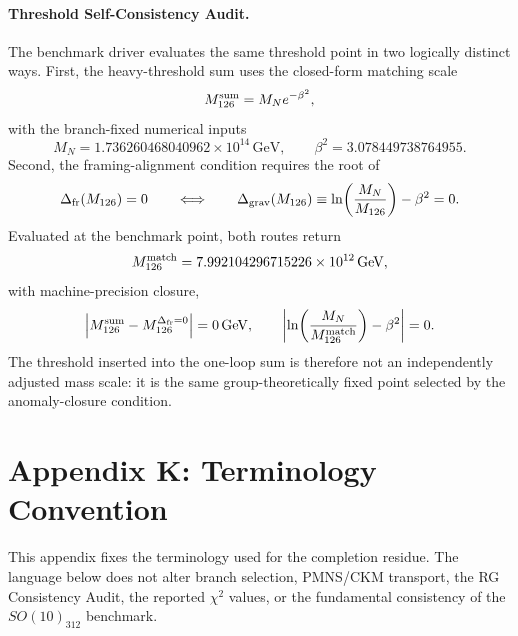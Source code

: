 \documentclass[11pt]{article}
\makeatletter
\newcommand{\manualappendixlabel}[2]{%
  \begingroup
  \def\@currentlabel{#1}%
  \label{#2}%
  \endgroup
}
\makeatother
\begin{document}
\paragraph{Threshold Self-Consistency Audit.}
The benchmark driver evaluates the same threshold point in two logically distinct ways. First, the heavy-threshold sum uses the closed-form matching scale
\begin{equation}
 M_{126}^{\rm sum}=M_Ne^{-\beta^2},
\end{equation}
with the branch-fixed numerical inputs
\begin{equation}
 M_N=1.736260468040962\times10^{14}\,\mathrm{GeV},
 \qquad
 \beta^2=3.078449738764955.
\end{equation}
Second, the framing-alignment condition requires the root of
\begin{equation}
 \Delta_{\rm fr}(M_{126})=0
 \qquad\Longleftrightarrow\qquad
 \Delta_{\rm grav}(M_{126})\equiv\ln\!\left(\frac{M_N}{M_{126}}\right)-\beta^2=0.
\end{equation}
Evaluated at the benchmark point, both routes return
\begin{equation}
 M_{126}^{\rm match}=7.992104296715226\times10^{12}\,\mathrm{GeV},
\end{equation}
with machine-precision closure,
\begin{equation}
 \left|M_{126}^{\rm sum}-M_{126}^{\Delta_{\rm fr}=0}\right|=0\,\mathrm{GeV},
 \qquad
 \left|\ln\!\left(\frac{M_N}{M_{126}^{\rm match}}\right)-\beta^2\right|=0.
\end{equation}
The threshold inserted into the one-loop sum is therefore not an independently adjusted mass scale: it is the same group-theoretically fixed point selected by the anomaly-closure condition.


\section*{Appendix K: Terminology Convention}\manualappendixlabel{K}{app:interpretive-mappings}

This appendix fixes the terminology used for the completion residue. The
language below does not alter branch selection, PMNS/CKM transport, the RG
Consistency Audit, the reported $\chi^2$ values, or the fundamental
consistency of the $SO(10)_{312}$ benchmark.
\end{document}
